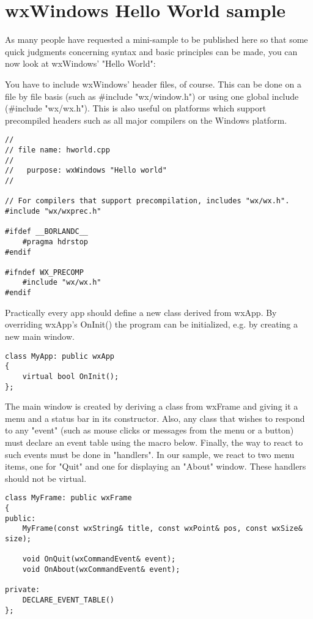\section{wxWindows Hello World sample}\label{helloworld}

As many people have requested a mini-sample to be published here
so that some quick judgments concerning syntax
and basic principles can be made, you can now look at wxWindows'
"Hello World":

You have to include wxWindows' header files, of course. This can
be done on a file by file basis (such as \#include "wx/window.h")
or using one global include (\#include "wx/wx.h"). This is
also useful on platforms which support precompiled headers such
as all major compilers on the Windows platform.

\begin{verbatim}
//
// file name: hworld.cpp
//
//   purpose: wxWindows "Hello world"
//

// For compilers that support precompilation, includes "wx/wx.h".
#include "wx/wxprec.h"

#ifdef __BORLANDC__
    #pragma hdrstop
#endif

#ifndef WX_PRECOMP
    #include "wx/wx.h"
#endif
\end{verbatim}

Practically every app should define a new class derived from wxApp.
By overriding wxApp's OnInit() the program can be initialized,
e.g. by creating a new main window. 

\begin{verbatim}
class MyApp: public wxApp
{
    virtual bool OnInit();
};
\end{verbatim}

The main window is created by deriving a class from wxFrame and 
giving it a menu and a status bar in its constructor. Also, any class
that wishes to respond to any "event" (such as mouse clicks or
messages from the menu or a button) must declare an event table 
using the macro below. Finally, the way to react to such events 
must be done in "handlers". In our sample, we react to two menu items, 
one for "Quit" and one for displaying an "About" window. These
handlers should not be virtual.

\begin{verbatim}
class MyFrame: public wxFrame
{
public:
    MyFrame(const wxString& title, const wxPoint& pos, const wxSize& size);

    void OnQuit(wxCommandEvent& event);
    void OnAbout(wxCommandEvent& event);

private:
    DECLARE_EVENT_TABLE()
};
\end{verbatim}


